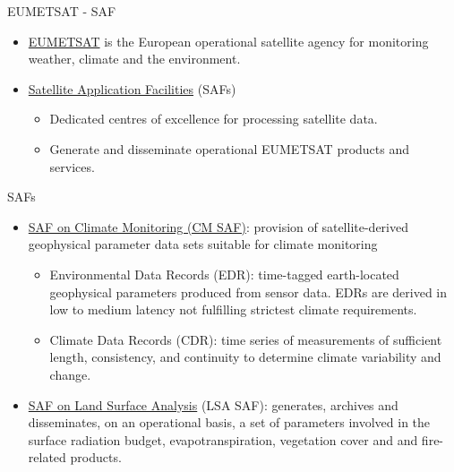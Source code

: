 \documentclass[xcolor={usenames,svgnames,dvipsnames}]{beamer}
\begin{document}
\begin{frame}[label=sec-6-6-2]{EUMETSAT - SAF}
\begin{itemize}
\item \alert{\href{http://www.eumetsat.int}{EUMETSAT}} is the European operational satellite agency for monitoring
weather, climate and the environment.
\item \alert{\href{http://www.eumetsat.int/website/home/Satellites/GroundSegment/Safs/index.html}{Satellite Application Facilities} (SAFs)}
\begin{itemize}
\item Dedicated centres of excellence for processing satellite data.
\item Generate and disseminate operational EUMETSAT products and
services.
\end{itemize}
\end{itemize}
\end{frame}

\begin{frame}[label=sec-6-6-3]{SAFs}
\begin{itemize}
\item \href{http://www.cmsaf.eu/bvbw/appmanager/bvbw/cmsafInternet}{SAF on Climate Monitoring (CM SAF)}: provision of satellite-derived geophysical parameter data sets suitable for \alert{climate monitoring}

\begin{itemize}
\item Environmental Data Records (EDR): time-tagged earth-located
geophysical parameters produced from sensor data. EDRs are derived
in low to medium latency not fulfilling strictest climate
requirements.

\item Climate Data Records (CDR): time series of measurements of
sufficient length, consistency, and continuity to determine climate
variability and change.
\end{itemize}

\item \href{http://landsaf.meteo.pt}{SAF on Land Surface Analysis} (LSA SAF): generates, archives and
disseminates, on an \alert{operational basis}, a set of parameters involved
in the surface radiation budget, evapotranspiration, vegetation
cover and and fire-related products.
\end{itemize}
\end{frame}
\end{document}

